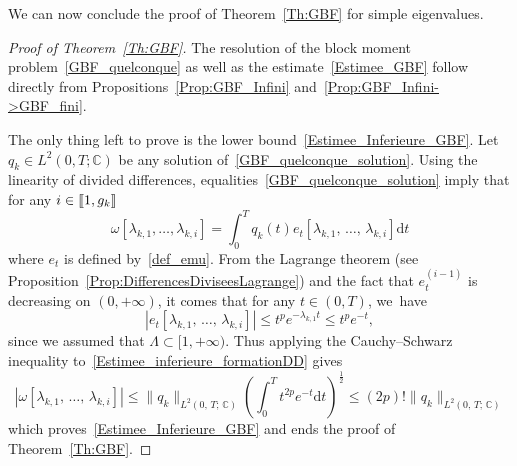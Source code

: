 \documentclass[AHL,Unicode,longabstracts]{cedram}
\newcommand{\llbracket}{\mathopen{[\mkern -2.7mu[}}
\newcommand{\rrbracket}{\mathclose{]\mkern -2.7mu]}}
\newcommand{\inter}[2]{\llbracket #1,#2 \rrbracket}
\newcommand{\n}{g}
\newcommand{\C}{\mathbb{C}}
\newcommand{\md}{\mathrm{d}}
\begin{document}
We can now conclude the proof of Theorem~\ref{Th:GBF} for simple eigenvalues.
\begin{proof}[Proof of Theorem~\ref{Th:GBF}]
The resolution of the block moment problem~\eqref{GBF_quelconque} as well as the estimate~\eqref{Estimee_GBF} follow directly from Propositions~\ref{Prop:GBF_Infini} and~\ref{Prop:GBF_Infini->GBF_fini}.

The only thing left to prove is the lower bound~\eqref{Estimee_Inferieure_GBF}. Let $q_k \in L^2(0,T;\C)$ be any solution of~\eqref{GBF_quelconque_solution}. Using the linearity of divided differences, equalities~\eqref{GBF_quelconque_solution} imply that for any $i \in \inter{1}{\n_k}$
\begin{equation}\label{Estimee_inferieure_formationDD}
\omega[\lambda_{k,1}, \dots, \lambda_{k,i}] = \int_0^T q_k(t) e_t[\lambda_{k,1},\,\dots,\, \lambda_{k,i}] \md t
\end{equation}
where $e_t$ is defined by~\eqref{def_emu}. From the Lagrange theorem (see Proposition~\ref{Prop:DifferencesDiviseesLagrange}) and the fact that $e_t^{(i-1)}$ is decreasing on $(0,+\infty)$, it comes that for any $t \in (0,T)$, we~have
\[
\left| e_t[\lambda_{k,1},\,\dots,\, \lambda_{k,i}] \right|\leq t^p e^{-\lambda_{k,1} t} \leq t^p e^{-t},
\]
since we assumed that $\Lambda\subset [1,+\infty)$. Thus applying the Cauchy--Schwarz inequality to~\eqref{Estimee_inferieure_formationDD} gives
\[
\left| \omega[\lambda_{k,1},\,\dots,\, \lambda_{k,i}] \right| \leq \| q_k \|_{L^2(0,\,T;\,\C)} \left(\int_0^T t^{2p} e^{-t} \md t\right)^{\frac{1}{2}} \leq (2p)! \| q_k \|_{L^2(0,\,T;\,\C)}
\]
which proves~\eqref{Estimee_Inferieure_GBF} and ends the proof of Theorem~\ref{Th:GBF}.
\end{proof}
\end{document}
